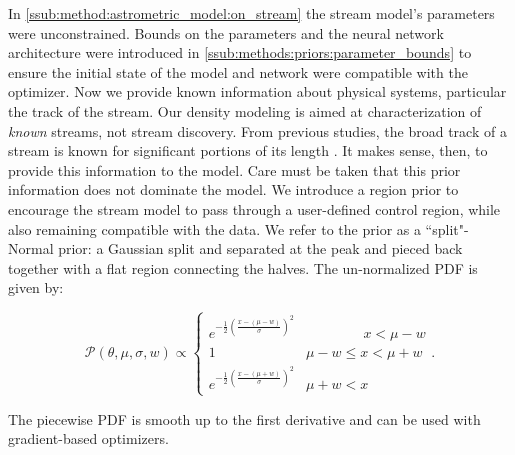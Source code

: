 \documentclass[twocolumn]{aastex631}
\newcommand{\mcal}[1]{\mathcal{#1}}
\newcommand{\Exp}[1]{e^{#1}}
\newcommand{\pdf}{\mcal{P}}
\begin{document}
            In \autoref{ssub:method:astrometric_model:on_stream} the stream
            model's parameters were unconstrained. Bounds on the parameters and
            the neural network architecture were introduced in
            \autoref{ssub:methods:priors:parameter_bounds} to ensure the initial
            state of the model and network were compatible with the optimizer.
            Now we provide known information about physical systems, particular
            the track of the stream.  Our density modeling is aimed at
            characterization of \textit{known} streams, not stream discovery.
            From previous studies, the broad track of a stream is known for
            significant portions of its length \citep[e.g. see the atlas
            in][]{Mateu2022}. It makes sense, then, to provide this information
            to the model. Care must be taken that this prior information does
            not dominate the model.
            We introduce a region prior to encourage the stream model to pass
            through a user-defined control region, while also remaining
            compatible with the data.  We refer to the prior as a
            ``split"-Normal prior: a Gaussian split and separated at the peak
            and pieced back together with a flat region connecting the halves.
            The un-normalized PDF is given by:
            \begin{small}
            \begin{equation}
                \pdf(\theta,\mu,\sigma,w) \propto \begin{cases} 
                   \Exp{-\frac{1}{2}\left(\frac{x-(\mu-w)}{\sigma}\right)^2} & \phantom{\mu - w <}\ x < \mu - w \\
                    1 & \mu - w \leq x < \mu + w \\
                    \Exp{-\frac{1}{2}\left(\frac{x-(\mu+w)}{\sigma}\right)^2} & \mu + w < x
                \end{cases}.
            \end{equation}\end{small}
            The piecewise PDF is smooth up to the first derivative and can be
            used with gradient-based optimizers.
\end{document}
